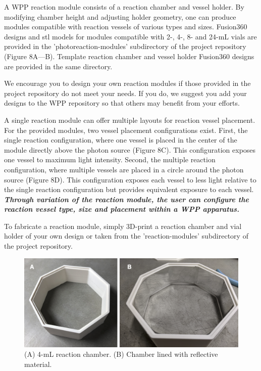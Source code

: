 \documentclass[11pt]{article}
\begin{document}
A WPP reaction module consists of a reaction chamber and vessel holder.
By modifying chamber height and adjusting holder geometry, one can produce modules compatible with reaction vessels of various types and sizes.
Fusion360 designs and stl models for modules compatible with 2-, 4-, 8- and 24-mL vials are provided in the 'photoreaction-modules' subdirectory of the project repository (Figure 8A—B).
Template reaction chamber and vessel holder Fusion360 designs are provided in the same directory.

We encourage you to design your own reaction modules if those provided in the project repository do not meet your needs.
If you do, we suggest you add your designs to the WPP repository so that others may benefit from your efforts.

A single reaction module can offer multiple layouts for reaction vessel placement.
For the provided modules, two vessel placement configurations exist.
First, the single reaction configuration, where one vessel is placed in the center of the module directly above the photon source (Figure 8C).
This configuration exposes one vessel to maximum light intensity.
Second, the multiple reaction configuration, where multiple vessels are placed in a circle around the photon source (Figure 8D).
This configuration exposes each vessel to less light relative to the single reaction configuration but provides equivalent exposure to each vessel.
\textbf{\textit{Through variation of the reaction module, the user can configure the reaction vessel type, size and placement within a WPP apparatus.}}

To fabricate a reaction module, simply 3D-print a reaction chamber and vial holder of your own design or taken from the 'reaction-modules' subdirectory of the project repository.

\begin{figure}[H]
	\centering
	\includegraphics[width=\textwidth]{"./fig9.png"}
	\caption{(A) 4-mL reaction chamber. (B) Chamber lined with reflective material.}
\end{figure}
\end{document}
